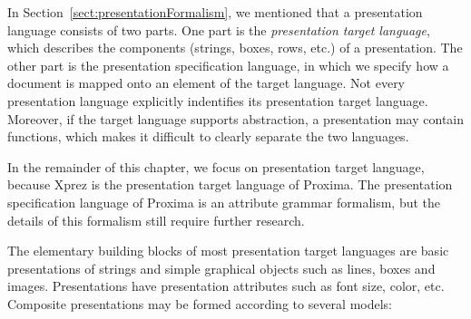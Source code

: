In Section~\ref{sect:presentationFormalism}, we mentioned that a presentation language consists of two parts. One part is the {\em presentation target language}, which describes the components (strings, boxes, rows, etc.) of a presentation. The other part is the presentation specification language, in which we specify how a document is mapped onto an element of the target language. Not every presentation language explicitly indentifies its presentation target language. Moreover, if the target language supports abstraction, a presentation may contain functions, which makes it difficult to clearly separate the two languages.

In the remainder of this chapter, we focus on presentation target language, because {\sc Xprez} is the presentation target language of Proxima. The presentation specification language of Proxima is an attribute grammar formalism, but the details of this formalism still require further research. %

\toHere
The elementary building blocks of most presentation target languages are basic presentations of strings and simple graphical objects such as lines, boxes and images. Presentations have presentation attributes such as font size, color, etc. Composite presentations may be formed according to several models:

